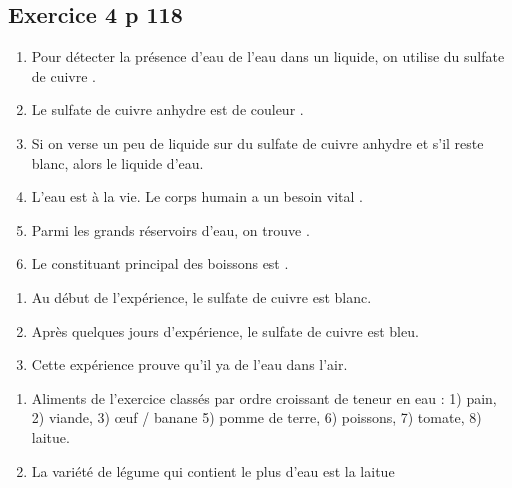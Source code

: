 \documentclass[12pt,a4paper]{article}
\begin{document}
\subsection*{Exercice 4 p 118}


	\begin{enumerate}[label=\alph*)]
		\item Pour détecter la présence d'eau de l'eau dans un liquide, on utilise du sulfate de cuivre .
		
		\item Le sulfate de cuivre anhydre est de couleur .
		\item Si on verse un peu de liquide sur du sulfate de cuivre anhydre et s'il reste blanc, alors le liquide  d'eau.
		\item L'eau est  à la vie. Le corps humain a un besoin vital .
		\item Parmi les grands réservoirs d'eau, on trouve .
		\item Le constituant principal des boissons est .
	\end{enumerate}




\begin{enumerate}[label=\alph*)]
	\item Au début de l'expérience, le sulfate de cuivre est blanc.
	\item Après quelques jours d'expérience, le sulfate de cuivre est bleu.
	\item Cette expérience prouve qu'il ya de l'eau dans l'air.
\end{enumerate}


\begin{enumerate}[label=\alph*)]
	\item Aliments de l'exercice classés par ordre croissant de teneur en eau :
	1) pain, 2) viande, 3) \oe uf / banane 5) pomme de terre, 6) poissons, 7) tomate, 8) laitue.
	\item La variété de légume qui contient le plus d'eau est la laitue
\end{enumerate}

\newpage

\subsection*{}
\end{document}
